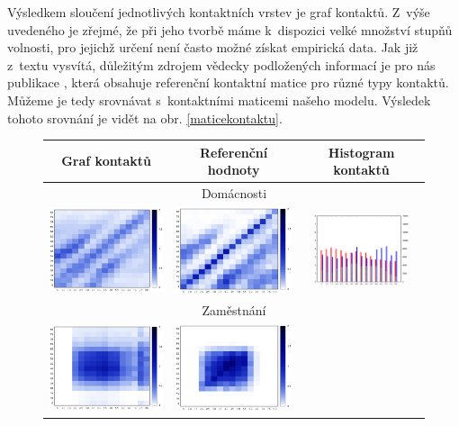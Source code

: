 Výsledkem sloučení jednotlivých kontaktních vrstev je graf kontaktů. Z~výše uvedeného je zřejmé, že při jeho tvorbě máme k~dispozici velké množství stupňů volnosti, pro jejichž určení není často možné získat empirická data. Jak již z~textu vysvítá, důležitým zdrojem vědecky podložených informací je pro nás publikace \cite{Prem_etal2017}, která obsahuje referenční kontaktní matice pro různé typy kontaktů. Můžeme je tedy srovnávat s~kontaktními maticemi našeho modelu. Výsledek tohoto srovnání je vidět na obr. \ref{maticekontaktu}.

\begin{figure}
\begin{center}
\begin{tabular}{|ccc|}
      \hline
      Graf kontaktů & Referenční hodnoty & Histogram kontaktů\\
      \hline
      \hline
      \multicolumn{3}{|c|}{Domácnosti} \\
      \includegraphics[width=38mm]{pic/home_mat.eps} &
      \includegraphics[width=38mm]{pic/home_mat_ref.eps} &
      \includegraphics[width=28mm]{pic/home.eps}\\
      \hline
      \multicolumn{3}{|c|}{Zaměstnání} \\
      \includegraphics[width=38mm]{pic/work_mat.eps} &
      \includegraphics[width=38mm]{pic/work_mat_ref.eps} &

\end{tabular}
\end{center}
\end{figure}
